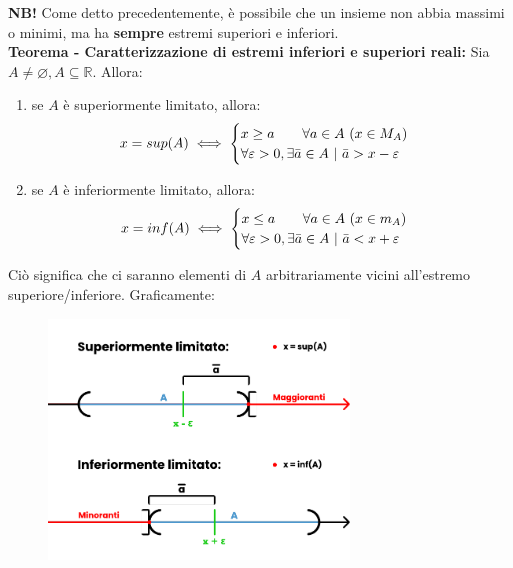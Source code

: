 \documentclass{article}
\begin{document}
\noindent\textbf{NB!} Come detto precedentemente, è possibile che un insieme non abbia massimi o minimi, ma ha \textbf{sempre} estremi superiori e inferiori. \\

\noindent\textbf{Teorema - Caratterizzazione di estremi inferiori e superiori reali:} Sia $A \neq \varnothing, A \subseteq \mathbb{R}$. Allora:

\begin{enumerate}[label=\alph{enumi})]
    \item se $A$ è superiormente limitato, allora: 
    \begin{equation*}
        x = sup(A) \iff \begin{cases}
            x \geq a \qquad \forall a \in A \ (x \in M_A) \\
            \forall \varepsilon > 0, \exists \Bar{a} \in A \ | \ \Bar{a} > x - \varepsilon
        \end{cases}
    \end{equation*}
    \item se $A$ è inferiormente limitato, allora:
    \begin{equation*}
        x = inf(A) \iff \begin{cases}
            x \leq a \qquad \forall a \in A \ (x \in m_A) \\
            \forall \varepsilon > 0, \exists \Bar{a} \in A \ | \ \Bar{a} < x + \varepsilon
        \end{cases}
    \end{equation*}
\end{enumerate}

\noindent Ciò significa che ci saranno elementi di $A$ arbitrariamente vicini all'estremo superiore/inferiore. Graficamente:

\begin{center}
    \begin{figure}[!h]
        \centering
        \includegraphics[width=8cm]{./images/infSupTheorem.pdf}
    \end{figure}
\end{center}
\end{document}
